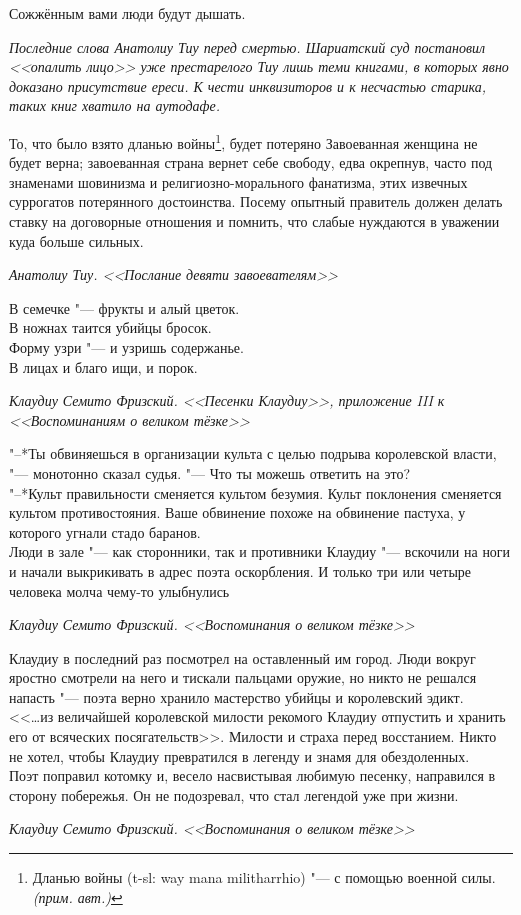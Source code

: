 \documentclass[a4paper,10pt,fleqn]{book}
\newcommand{\ldotst}{\so{...}\xspace}
\newcommand{\authornote}{\textit{(прим. авт.)}}
\begin{document}
\epigraph{Сожжённым вами люди будут дышать.}
{\textit{Последние слова Анатолиу Тиу перед смертью.
Шариатский суд постановил <<опалить лицо>> уже престарелого Тиу лишь теми книгами, в которых явно доказано присутствие ереси.
К чести инквизиторов и к несчастью старика, таких книг хватило на аутодафе.}}

\epigraph{То, что было взято дланью войны\footnote
{Дланью войны (t-sl: way mana militharrhio) "--- с помощью военной силы. \authornote},
будет потеряно\ldotst
Завоеванная женщина не будет верна;
завоеванная страна вернет себе свободу, едва окрепнув, часто под знаменами шовинизма и религиозно-морального фанатизма, этих извечных суррогатов потерянного достоинства.
Посему опытный правитель должен делать ставку на договорные отношения\ldotst и помнить, что слабые нуждаются в уважении куда больше сильных.}
{\textit{Анатолиу Тиу. <<Послание девяти завоевателям>>}}

\epigraph{В семечке "--- фрукты и алый цветок.\\
В ножнах таится убийцы бросок.\\
Форму узри "--- и узришь содержанье.\\
В лицах и благо ищи, и порок.}
{\textit{Клаудиу Семито Фризский. <<Песенки Клаудиу>>, приложение III к <<Воспоминаниям о великом тёзке>>}}

\epigraph{"--*Ты обвиняешься в организации культа с целью подрыва королевской власти, "--- монотонно сказал судья.
"--- Что ты можешь ответить на это?\\
"--*Культ правильности сменяется культом безумия.
Культ поклонения сменяется культом противостояния.
Ваше обвинение похоже на обвинение пастуха, у которого угнали стадо баранов.\\
Люди в зале "--- как сторонники, так и противники Клаудиу "--- вскочили на ноги и начали выкрикивать в адрес поэта оскорбления.
И только три или четыре человека молча чему-то улыбнулись\ldotst}
{\textit{Клаудиу Семито Фризский. <<Воспоминания о великом тёзке>>}}

\epigraph{Клаудиу в последний раз посмотрел на оставленный им город.
Люди вокруг яростно смотрели на него и тискали пальцами оружие, но никто не решался напасть "--- поэта верно хранило мастерство убийцы и королевский эдикт.\\
<<\ldots из величайшей королевской милости рекомого Клаудиу отпустить и хранить его от всяческих посягательств>>.
Милости и страха перед восстанием.
Никто не хотел, чтобы Клаудиу превратился в легенду и знамя для обездоленных.\\
Поэт поправил котомку и, весело насвистывая любимую песенку, направился в сторону побережья.
Он не подозревал, что стал легендой уже при жизни.}
{\textit{Клаудиу Семито Фризский. <<Воспоминания о великом тёзке>>}}
\end{document}
